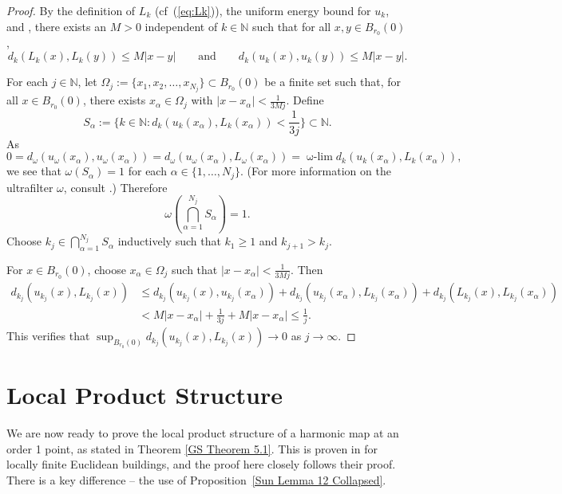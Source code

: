\documentclass[12pt]{amsart}
\theoremstyle{definition}
\numberwithin{equation}{section}
\newcommand{\N}{\mathbb N}
\newcommand{\B}{B}
\newcommand\wlim{\mathop{\mbox{$\omega$-$\lim$}}}
\begin{document}
\begin{proof}
By the definition of $L_k$ (cf~(\ref{eq:Lk})), the uniform energy bound for $u_k$, and \cite[Theorem 2.4.6]{korevaar-schoen1}, there exists an $M>0$ independent of $k \in \N$ such that for all $x,y \in \B_{r_0}(0)$,
\[
d_k(L_k(x), L_k(y))\leq M|x-y| \quad \quad \text{and} \quad \quad d_k(u_k(x), u_k(y))\leq M|x-y|.
\]  

For each $j \in \mathbb N$,  let $\Omega_j:=\{x_1, x_2, \dots, x_{N_j}\}\subset B_{r_0}(0)$ be a finite set such that, for all $x \in \B_{r_0}(0)$, there exists $x_\alpha \in \Omega_j$ with  $|x-x_\alpha|< \frac 1{3Mj}$. Define
\[
S_\alpha:=\{ k \in \N: d_k(u_k(x_\alpha), L_k(x_\alpha))< \frac 1{3j}\} \subset \N.
\]As 
\[
0=d_\omega(u_\omega(x_\alpha), u_\omega(x_\alpha))= d_\omega(u_\omega(x_\alpha), L_\omega(x_\alpha))= \wlim d_k(u_k(x_\alpha), L_k(x_\alpha)),
\]we see that $\omega(S_\alpha)=1$ for each $\alpha \in \{1, \dots, N_j\}$. (For more information on the ultrafilter $\omega$, consult \cite[Section 2.4.1]{kleiner-leeb}.) Therefore 
\[
\omega\left(\bigcap_{\alpha=1}^{N_j} S_\alpha\right)=1.
\]Choose $k_j \in \bigcap_{\alpha=1}^{N_j} S_\alpha$ inductively such that $k_1 \geq 1$ and $k_{j+1} > k_j$.

 For $x \in B_{r_0}(0)$, choose $x_\alpha \in \Omega_j$ such that $|x-x_\alpha|< \frac 1{3Mj}$. Then
\begin{align*}
d_{k_j}(u_{k_j}(x), L_{k_j}(x)) &\leq d_{k_j}(u_{k_j}(x), u_{k_j}(x_\alpha))+d_{k_j}(u_{k_j}(x_\alpha), L_{k_j}(x_\alpha))+d_{k_j}(L_{k_j}(x), L_{k_j}(x_\alpha))\\
& < M|x-x_\alpha| + \frac 1{3j} + M|x-x_\alpha|
\leq \frac 1j.
\end{align*}
This verifies that $\sup_{\B_{r_0}(0)}d_{k_j}(u_{k_j}(x), L_{k_j}(x))\rightarrow  0$ as $j \rightarrow \infty$. 
\end{proof}









\section{Local Product Structure}\label{sec:noregFin}

We are now ready to prove the local product structure  of a harmonic map at an order 1 point, as stated in Theorem \ref{GS Theorem 5.1}.  This  is proven in \cite[Theorem 5.1]{gromov-schoen} for locally finite Euclidean buildings, and the proof here closely follows  their proof. There is a key difference --  the use of Proposition~\ref{Sun Lemma 12 Collapsed}.  
\end{document}
